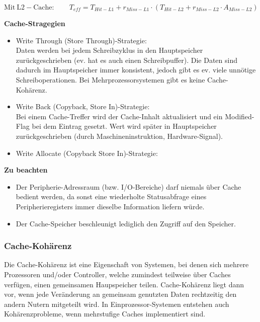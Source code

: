 \begin{equation*}
\mathrm{Mit \ L2-Cache:} \qquad T_{eff} = T_{Hit-L1} + r_{Miss-L1} \cdot \left( T_{Hit-L2} + r_{Miss-L2} \cdot A_{Miss-L2} \right)
\end{equation*}

\textbf{Cache-Stragegien}
\begin{itemize}[noitemsep,topsep=0pt]
	\item Write Through (Store Through)-Strategie:\\
	Daten werden bei jedem Schreibzyklus in den Hauptspeicher zurückgeschrieben (ev. hat es auch einen Schreibpuffer).
	Die Daten sind dadurch im Hauptspeicher immer konsistent, jedoch gibt es ev. viele unnötige Schreiboperationen.
	Bei Mehrprozessorsystemen gibt es keine Cache-Kohärenz.
	
	\item Write Back (Copyback, Store In)-Strategie:\\
	Bei einem Cache-Treffer wird der Cache-Inhalt aktualisiert und ein Modified-Flag bei dem Eintrag gesetzt.
	Wert wird später in Hauptspeicher zurückgeschrieben (durch Maschineninstruktion, Hardware-Signal).
	
	\item Write Allocate (Copyback Store In)-Strategie:
\end{itemize}

\textbf{Zu beachten}
\begin{itemize}[noitemsep,topsep=0pt]
	\item Der Peripherie-Adressraum (bzw. I/O-Bereiche) darf niemals über Cache bedient werden, da sonst eine wiederholte Statusabfrage eines Peripherieregisters immer dieselbe Information liefern würde.
	
	\item Der Cache-Speicher beschleunigt lediglich den Zugriff auf den Speicher.
	
\end{itemize}

\subsubsection{Cache-Kohärenz}
Die Cache-Kohärenz ist eine Eigenschaft von Systemen, bei denen sich mehrere Prozessoren und/oder Controller, welche zumindest teilweise über Caches verfügen, einen gemeinsamen Haupspeicher teilen.
Cache-Kohärenz liegt dann vor, wenn jede Veränderung an gemeinsam genutzten Daten rechtzeitig den andern Nutern mitgeteilt wird.
In Einprozessor-Systemen entstehen auch Kohärenzprobleme, wenn mehrstufige Caches implementiert sind.

